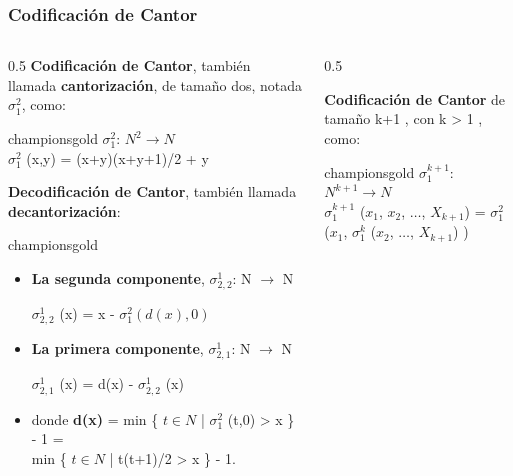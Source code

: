 \documentclass[xcolor=table]{beamer}
\begin{document}
\begin{frame}[fragile]\frametitle{Codificación de Cantor} \scriptsize


\begin{columns}

    \begin{column}{0.5\textwidth}
     \textbf{Codificación de Cantor}, también llamada \textbf{cantorización}, de tamaño dos, notada $\sigma_1^2$, como:

         \begin{colorblock}[black]{championsgold}{}\scriptsize
        $\sigma_1^2$: $N^2 \rightarrow N$\\
            $\sigma_1^2$ (x,y) = (x+y)(x+y+1)/2 + y
        \end{colorblock}

    \textbf{Decodificación de Cantor}, también llamada \textbf{decantorización}:

      \begin{colorblock}[black]{championsgold}{}\scriptsize

        \begin{itemize}
            \item \textbf{La segunda componente}, $\sigma^1_{2,2}$: N $\rightarrow$ N
            
             $\sigma^1_{2,2}$ (x) = x -  $\sigma^2_{1} (d(x),0) $
             
            
            \item \textbf{La primera componente}, $\sigma^1_{2,1}$: N $\rightarrow$ N

            $\sigma^1_{2,1}$ (x) = d(x) - $\sigma^1_{2,2}$ (x) 

            \item  donde \textbf{d(x)} = min \{ $t \in N$ | $\sigma_1^2$ (t,0) > x \} - 1 =\\
             min \{ $t \in N$ | t(t+1)/2 > x \} - 1.
        \end{itemize}


        \end{colorblock}
         
    
    \end{column}

    \begin{column}{0.5\textwidth}

    \textbf{Codificación de Cantor} de tamaño k+1 , con k > 1 , como:
        
        
        \begin{colorblock}[black]{championsgold}{}\scriptsize
        $\sigma_1^{k+1}$: $N^{k+1} \rightarrow N$\\
        $\sigma_1^{k+1}$ ($x_1$, $x_2$, $\ldots$, $X_{k+1}$) = $\sigma_1^2$ ($x_1$, $\sigma_1^k$ ($x_2$, $\ldots$, $X_{k+1}$) )
        \end{colorblock}



\end{column}
\end{columns}
\end{frame}
\end{document}
